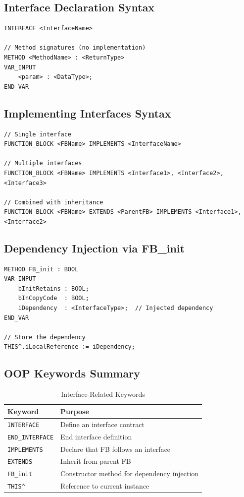 \documentclass[11pt,a4paper]{article}
\begin{document}
\subsection*{Interface Declaration Syntax}

\begin{lstlisting}
INTERFACE <InterfaceName>

// Method signatures (no implementation)
METHOD <MethodName> : <ReturnType>
VAR_INPUT
    <param> : <DataType>;
END_VAR
\end{lstlisting}

\subsection*{Implementing Interfaces Syntax}

\begin{lstlisting}
// Single interface
FUNCTION_BLOCK <FBName> IMPLEMENTS <InterfaceName>

// Multiple interfaces
FUNCTION_BLOCK <FBName> IMPLEMENTS <Interface1>, <Interface2>, <Interface3>

// Combined with inheritance
FUNCTION_BLOCK <FBName> EXTENDS <ParentFB> IMPLEMENTS <Interface1>, <Interface2>
\end{lstlisting}

\subsection*{Dependency Injection via FB\_init}

\begin{lstlisting}
METHOD FB_init : BOOL
VAR_INPUT
    bInitRetains : BOOL;
    bInCopyCode  : BOOL;
    iDependency  : <InterfaceType>;  // Injected dependency
END_VAR

// Store the dependency
THIS^.iLocalReference := iDependency;
\end{lstlisting}

\subsection*{OOP Keywords Summary}

\begin{table}[h]
\centering
\begin{tabular}{@{}ll@{}}
\toprule
\textbf{Keyword} & \textbf{Purpose} \\
\midrule
\texttt{INTERFACE} & Define an interface contract \\
\texttt{END\_INTERFACE} & End interface definition \\
\texttt{IMPLEMENTS} & Declare that FB follows an interface \\
\texttt{EXTENDS} & Inherit from parent FB \\
\texttt{FB\_init} & Constructor method for dependency injection \\
\texttt{THIS\^{}} & Reference to current instance \\
\bottomrule
\end{tabular}
\caption{Interface-Related Keywords}
\end{table}
\end{document}
